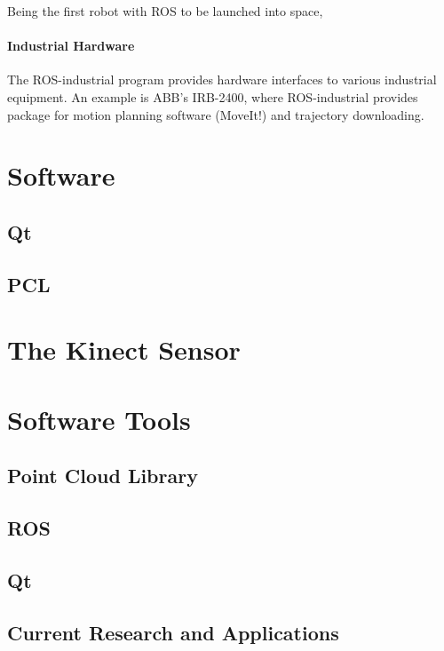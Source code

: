 Being the first robot with \ac{ROS} to be launched into space, 

\paragraph{Industrial Hardware}

The ROS-industrial program\cite{ROS_industrial} provides hardware interfaces to various industrial equipment. An example is ABB's IRB-2400, where \ac{ROS}-industrial provides package for motion planning software (MoveIt!) and trajectory downloading\cite{ROS_industria_hardware}. 

\section{Software}

\subsection{Qt}

\subsection{PCL}

\section{The Kinect Sensor}

\section{Software Tools}

\subsection{Point Cloud Library}

\subsection{ROS}

\subsection{Qt}


\subsection{Current Research and Applications}

